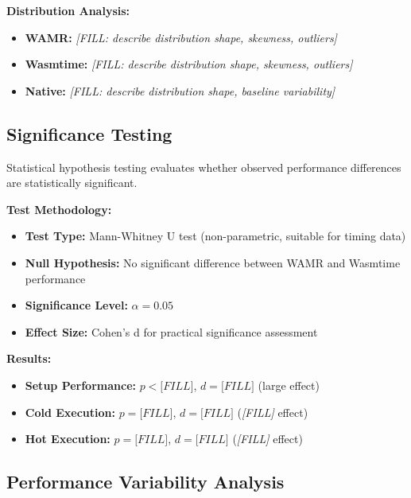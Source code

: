 \textbf{Distribution Analysis:}
\begin{itemize}
    \item \textbf{WAMR:} \textit{[FILL: describe distribution shape, skewness, outliers]}
    \item \textbf{Wasmtime:} \textit{[FILL: describe distribution shape, skewness, outliers]}
    \item \textbf{Native:} \textit{[FILL: describe distribution shape, baseline variability]}
\end{itemize}

\subsection{Significance Testing}
\label{subsec:significance-testing}

Statistical hypothesis testing evaluates whether observed performance differences are statistically significant.

\textbf{Test Methodology:}
\begin{itemize}
    \item \textbf{Test Type:} Mann-Whitney U test (non-parametric, suitable for timing data)
    \item \textbf{Null Hypothesis:} No significant difference between WAMR and Wasmtime performance
    \item \textbf{Significance Level:} $\alpha = 0.05$
    \item \textbf{Effect Size:} Cohen's d for practical significance assessment
\end{itemize}

\textbf{Results:}
\begin{itemize}
    \item \textbf{Setup Performance:} $p < \textit{[FILL]}$, $d = \textit{[FILL]}$ (large effect)
    \item \textbf{Cold Execution:} $p = \textit{[FILL]}$, $d = \textit{[FILL]}$ (\textit{[FILL]} effect)
    \item \textbf{Hot Execution:} $p = \textit{[FILL]}$, $d = \textit{[FILL]}$ (\textit{[FILL]} effect)
\end{itemize}

\subsection{Performance Variability Analysis}
\label{subsec:variability-analysis}

